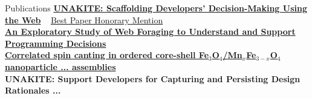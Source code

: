 \documentclass{resume}
\begin{document}
\begin{rSection}{Publications}
{\href{http://www.cs.cmu.edu/~NatProg/papers/p67-liu-Unakite-UIST.pdf}{\bf UNAKITE: Scaffolding Developers’ Decision-Making Using the Web} ~ \underline{Best Paper Honorary Mention}} \\
\href{http://www.cs.cmu.edu/~NatProg/papers/p305-hsieh.pdf}{\bf An Exploratory Study of Web Foraging to Understand and Support Programming Decisions }\\
\normalsize
{\href{https://janeon.github.io/assets/img/PhysRevB.99.094421.pdf}{\bf Correlated spin canting in ordered core-shell Fe$_3$O$_4$/Mn$_x$Fe$_{3-x}$O$_4$ nanoparticle ... assemblies} \\
{\bf UNAKITE: Support Developers for Capturing and Persisting Design Rationales ...} }
\end{rSection} \normalsize 
\end{document}
